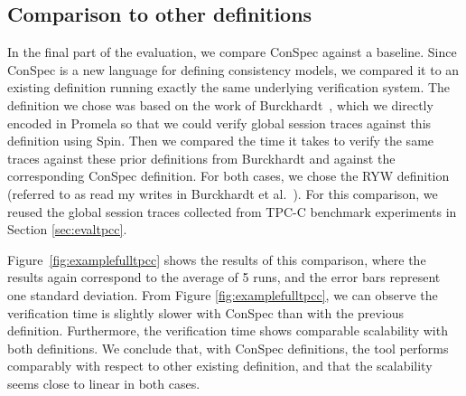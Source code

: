 \documentclass[journal, compsoc]{IEEEtran}
\begin{document}
	\subsection{Comparison to other definitions}\label{sec:evalcompar}
	
	
	In the final part of the evaluation, we compare ConSpec against a baseline. Since ConSpec is a new language for defining consistency models, we compared it to an existing definition running exactly the same underlying verification system. The definition we chose was based on the work of Burckhardt~\cite{DBLP:journals/ftpl/Burckhardt14}, which we directly encoded in Promela so that we could verify global session traces against this definition using Spin.  Then we compared the time it takes to verify the same traces against these prior definitions from Burckhardt and against the corresponding ConSpec definition. For both cases, we chose the RYW definition (referred to as read my writes in Burckhardt et al.~\cite{Burckhardt:2014:PEC:2693641.2693642}). %
	For this comparison, we reused the global session traces collected from TPC-C benchmark experiments in Section \ref{sec:evaltpcc}.
	
	Figure~\ref{fig:examplefulltpcc} shows the results of this comparison, where the results again correspond to the average of 5 runs, and the error bars represent one standard deviation. From Figure \ref{fig:examplefulltpcc}, we can observe the verification time is slightly slower with ConSpec than with the previous definition. Furthermore, the verification time shows comparable scalability with both definitions. %
	We conclude that, with ConSpec definitions, the tool performs comparably with respect to other existing definition, and that the scalability seems close to linear in both cases.
	
\end{document}
